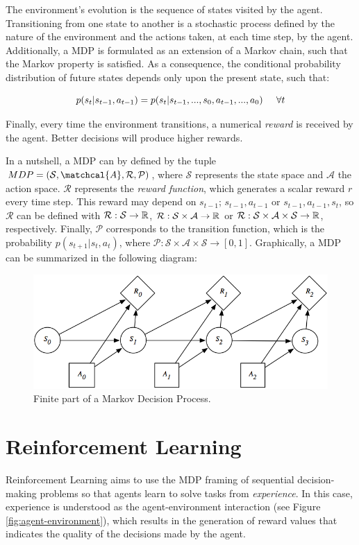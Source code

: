 The environment's evolution is the sequence of states visited by the agent. Transitioning from one state to another is a stochastic process defined by the nature of the environment and the actions taken, at each time step, by the agent. Additionally, a MDP is formulated as an extension of a Markov chain, such that the Markov property is satisfied. As a consequence, the conditional probability distribution of future states depends only upon the present state, such that:

\begin{equation}
    p(s_{t}|s_{t-1}, a_{t-1}) = p(s_{t}|s_{t-1},...,s_{0},a_{t-1},...,a_{0})  \hspace{0.5cm} \forall t
\end{equation}

Finally, every time the environment transitions, a numerical \emph{reward} is received by the agent. Better decisions will produce higher rewards.

In a nutshell, a MDP can by defined by the tuple $MDP=(\mathcal{S},\matchcal{A},\mathcal{R},\mathcal{P})$, where $\mathcal{S}$ represents the state space and $\mathcal{A}$ the action space. $\mathcal{R}$ represents the \emph{reward function}, which generates a scalar reward $r$ every time step. This reward may depend on $s_{t-1}$; $s_{t-1},a_{t-1}$ or $s_{t-1},a_{t-1},s_{t}$, so $\mathcal{R}$ can be defined with $\mathcal{R}: \mathcal{S} \to \mathbb{R}$, $\mathcal{R}: \mathcal{S} \times \mathcal{A} \to \mathbb{R}$ or $\mathcal{R}: \mathcal{S} \times \mathcal{A} \times \mathcal{S} \to \mathbb{R}$, respectively. Finally, $\mathcal{P}$ corresponds to the transition function, which is the probability $p(s_{t+1}|s_{t}, a_{t})$, where $\mathcal{P}: \mathcal{S} \times \mathcal{A} \times \mathcal{S} \to [0, 1]$. Graphically, a MDP can be summarized in the following diagram:

\begin{figure}[H]
    \centering
    \includegraphics[width=0.7\linewidth]{imagenes/cap1/mdp.png}
    \caption{Finite part of a Markov Decision Process.}
    \label{fig:msim}
\end{figure}

\section{Reinforcement Learning}
Reinforcement Learning aims to use the MDP framing of sequential decision-making problems so that agents learn to solve tasks from \emph{experience}. In this case, experience is understood as the agent-environment interaction (see Figure \ref{fig:agent-environment}), which results in the generation of reward values that indicates the quality of the decisions made by the agent. 

